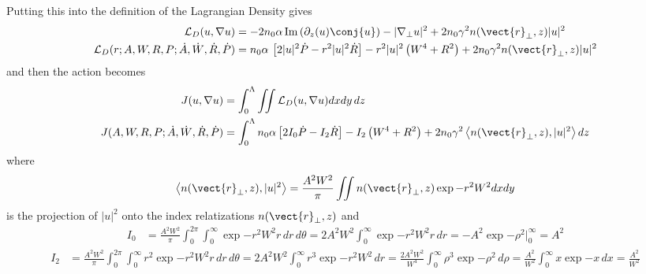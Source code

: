 Putting this into the definition of the Lagrangian Density gives
\begin{equation}
    \begin{split}
    \mathcal{L}_{D}(u,\nabla u) &=  -2 n_0 \alpha\, \mathrm{Im}\left(\partial_{z}(u) \conj{u}\right) - |\nabla_{\perp} u|^2 + 2n_0 \gamma^2 n(\vect{r}_{\perp},z) |u|^2 \\
        \mathcal{L}_{D}(r;A,W,R,P;\dot{A},\dot{W},\dot{R},\dot{P}) &= n_0 \alpha\,\left[2 |u|^2 \dot{P}-r^2 |u|^2 \dot{R} \right] - r^2 |u|^2 \left(W^4 + R^2\right) + 2 n_0 \gamma^2  n(\vect{r}_{\perp},z) |u|^2\\
    \end{split}
\end{equation}
and then the action becomes
\begin{equation}
    \begin{split}
        J(u,\nabla u) &= \int_{0}^{\Lambda} \iint \mathcal{L}_{D}(u,\nabla u) dx dy \, dz\\   
        J(A,W,R,P;\dot{A},\dot{W},\dot{R},\dot{P}) &= \int_{0}^{\Lambda} n_0 \alpha \left[2 I_0 \dot{P}  - I_2 \dot{R} \right] - I_2 \left(W^4 + R^2\right) +  2n_0 \gamma^2 \left< n(\vect{r}_{\perp},z),|u|^2  \right>   dz\\
    \end{split}
\end{equation}
where 
\begin{equation}
        \left< n(\vect{r}_{\perp},z), |u|^2  \right> =   \frac{A^2W^2}{\pi}  \iint n(\vect{r}_{\perp},z) \exp{-r^2 W^2} dx dy
\end{equation}
is the projection of $|u|^2$ onto the index relatizations $n(\vect{r}_{\perp},z)$ and 
\begin{equation}
    \begin{split}
        I_0 &=  \frac{A^2W^2}{\pi} \int_{0}^{2\pi} \int_{0}^{\infty} \exp{-r^2 W^2} r \,dr \,d\theta =  2A^2W^2 \int_{0}^{\infty} \exp{-r^2 W^2} r \,dr = - A^2 \exp{-\rho^2}\big|_{0}^{\infty} = A^2 
    \end{split}
\end{equation}
\begin{equation}
    \begin{split}
        I_2 &=  \frac{A^2W^2}{\pi} \int_{0}^{2\pi} \int_{0}^{\infty} r^2 \exp{-r^2 W^2} r \,dr \,d\theta = 2 A^2W^2 \int_{0}^{\infty} r^3 \exp{-r^2 W^2} \,dr = \frac{2 A^2W^2}{W^4} \int_{0}^{\infty} \rho^3 \exp{-\rho^2} \,d\rho = \frac{A^2}{W^2} \int_{0}^{\infty} x \exp{-x} \,dx =\frac{A^2}{W^2}       
    \end{split}
\end{equation}
